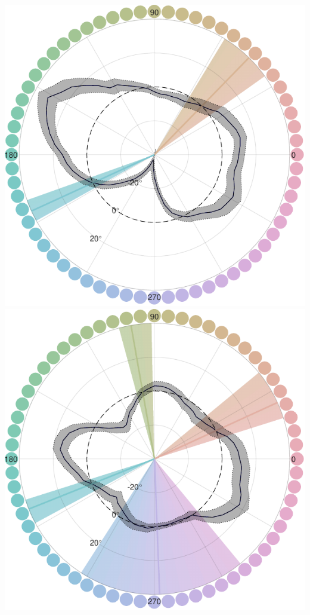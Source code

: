 \begin{minipage}{0.9\textwidth}

\includegraphics[width=0.49\linewidth]{../../../Outputs/Paper/Figures/working/7_IndiData_MixMod/210422--211012_Pollux_categorybias2_230225.pdf}
\label{fig:BiasCurvesPollux}
\hfill
\includegraphics[width=0.49\linewidth]{../../../Outputs/Paper/Figures/working/7_IndiData_MixMod/210517--211108_Castor_categorybias2_230225.pdf}
\label{fig:BiasCurvesCastor}


\end{minipage}
